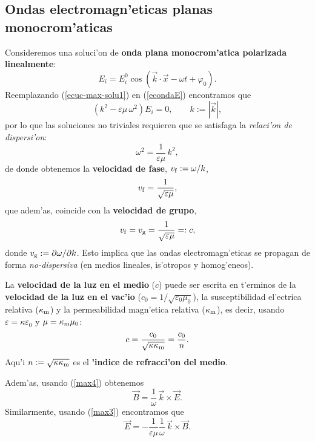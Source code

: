 \subsection{Ondas electromagn'eticas planas monocrom'aticas}
Consideremos una soluci'on de \textbf{onda plana monocrom'atica polarizada linealmente}:
\begin{equation}
E_i=E_i^0 \cos\left(\vec{k}\cdot\vec{x}-\omega t+\varphi_0\right)
.\label{ecuc-max-solu1}%
\end{equation}
Reemplazando (\ref{ecuc-max-solu1}) en (\ref{econdaE}) encontramos que%
\begin{equation}
\left(k^2-\varepsilon\mu\,\omega^2\right)  E_i=0, \qquad k:=|\vec{k}|,
\end{equation}
por lo que las soluciones no triviales requieren que se satisfaga la
\textit{relaci'on de dispersi'on}:
\begin{equation}
\omega^2=\frac{1}{\varepsilon\mu}\,k^2, \label{rdoem}
\end{equation}
de donde obtenemos la \textbf{velocidad de fase},
$v_{\rm f}:=\omega/k$,
\begin{equation}
v_{\rm f}=\frac{1}{\sqrt{\varepsilon\mu}},
\end{equation}
que adem'as, coincide con la \textbf{velocidad de grupo}, 
\begin{equation}
v_{\rm f}=v_{\rm g}=\frac{1}{\sqrt{\varepsilon\mu}}=:c,
\end{equation}
donde $v_{\rm g}:=\partial\omega/\partial k$. Esto implica que las ondas electromagn'eticas se propagan de forma \textit{no-dispersiva} (en medios lineales, is'otropos y homog'eneos). 

La \textbf{velocidad de la luz en el medio} ($c$) puede ser escrita en t'erminos de la \textbf{velocidad de la luz en el vac'io} ($c_0=1/\sqrt{\varepsilon_0\mu_0}$), la susceptibilidad el'ectrica relativa ($\kappa_{\rm m}$) y la permeabilidad magn'etica relativa ($\kappa_{\rm m}$), es decir, usando $\varepsilon=\kappa\varepsilon_0$ y $\mu=\kappa_{\rm m}\mu_0$:
\begin{equation}
c=\frac{c_0}{\sqrt{\kappa\kappa_{\rm m}}}=\frac{c_0}{n}.
\end{equation}
Aqu'i $n:=\sqrt{\kappa\kappa_{\rm m}}$ es el \textbf{'indice de refracci'on del medio}.

Adem'as, usando (\ref{max4}) obtenemos
\begin{equation}\label{BkE}
 \vec{B}=\frac{1}{\omega}\,\vec{k}\times\vec{E}.
\end{equation}
Similarmente, usando (\ref{max3}) encontramos que
\begin{equation}
 \vec{E}=-\frac{1}{\varepsilon\mu}\frac{1}{\omega}\,\vec{k}\times\vec{B}.
\end{equation}

